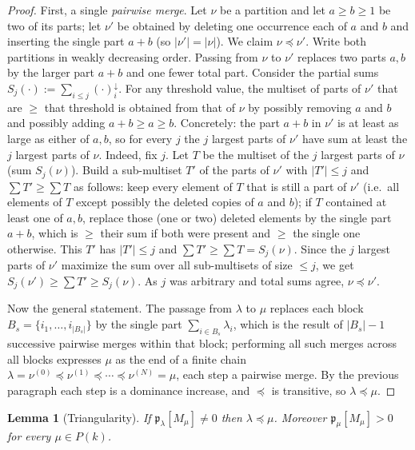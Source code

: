 \documentclass[12pt]{article}
\newtheorem{lemma}{Lemma}
\theoremstyle{definition}
\begin{document}
\begin{proof}
First, a single \emph{pairwise merge}.  Let $\nu$ be a partition and let $a\ge b\ge 1$ be
two of its parts; let $\nu'$ be obtained by deleting one occurrence each of $a$ and $b$ and
inserting the single part $a+b$ (so $|\nu'|=|\nu|$).  We claim $\nu\preceq\nu'$.  Write both
partitions in weakly decreasing order.  Passing from $\nu$ to $\nu'$ replaces two parts
$a,b$ by the larger part $a+b$ and one fewer total part.  Consider the partial sums
$S_j(\cdot):=\sum_{i\le j}(\cdot)^{\downarrow}_i$.  For any threshold value, the multiset of
parts of $\nu'$ that are $\ge$ that threshold is obtained from that of $\nu$ by possibly
removing $a$ and $b$ and possibly adding $a+b\ge a\ge b$.  Concretely: the part $a+b$ in
$\nu'$ is at least as large as either of $a,b$, so for every $j$ the $j$ largest parts of
$\nu'$ have sum at least the $j$ largest parts of $\nu$.  Indeed, fix $j$.  Let $T$ be the
multiset of the $j$ largest parts of $\nu$ (sum $S_j(\nu)$).  Build a sub-multiset $T'$ of
the parts of $\nu'$ with $|T'|\le j$ and $\sum T'\ge \sum T$ as follows: keep every element
of $T$ that is still a part of $\nu'$ (i.e.\ all elements of $T$ except possibly the deleted
copies of $a$ and $b$); if $T$ contained at least one of $a,b$, replace those (one or two)
deleted elements by the single part $a+b$, which is $\ge$ their sum if both were present and
$\ge$ the single one otherwise.  This $T'$ has $|T'|\le j$ and $\sum T'\ge\sum T=S_j(\nu)$.
Since the $j$ largest parts of $\nu'$ maximize the sum over all sub-multisets of size
$\le j$, we get $S_j(\nu')\ge\sum T'\ge S_j(\nu)$.  As $j$ was arbitrary and total sums
agree, $\nu\preceq\nu'$.

Now the general statement.  The passage from $\lambda$ to $\mu$ replaces each block
$B_s=\{i_1,\dots,i_{|B_s|}\}$ by the single part $\sum_{i\in B_s}\lambda_i$, which is the
result of $|B_s|-1$ successive pairwise merges within that block; performing all such merges
across all blocks expresses $\mu$ as the end of a finite chain
$\lambda=\nu^{(0)}\preceq\nu^{(1)}\preceq\cdots\preceq\nu^{(N)}=\mu$, each step a pairwise
merge.  By the previous paragraph each step is a dominance increase, and $\preceq$ is
transitive, so $\lambda\preceq\mu$.
\end{proof}

\begin{lemma}[Triangularity]\label{lem:tri}
If $\mathfrak{p}_\lambda[M_\mu]\neq 0$ then $\lambda\preceq\mu$.  Moreover
$\mathfrak{p}_\mu[M_\mu]>0$ for every $\mu\in P(k)$.
\end{lemma}
\end{document}
